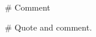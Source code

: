 # Comment
\newcommand{\cmt}[1]{\textit{\textcolor{red}{\footnotesize CMT: #1}}}

# Quote and comment.
\newcommand{\qcmt}[2]{\textit{\textcolor{red}{\footnotesize CMT: #1}} {\textcolor{blue}{#2}}}
